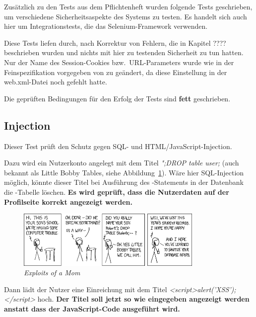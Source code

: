 
Zusätzlich zu den Tests aus dem Pflichtenheft wurden folgende Tests geschrieben,
um verschiedene Sicherheitsaspekte des Systems zu testen.
Es handelt sich auch hier um Integrationstests, die das Selenium-Framework verwenden.

Diese Tests liefen durch, nach Korrektur von Fehlern, die in Kapitel ???? beschrieben wurden und nichts mit hier zu testenden Sicherheit zu tun hatten.
Nur der Name des Session-Cookies bzw.~URL-Parameters wurde wie in der Feinspezifikation vorgegeben von  zu  geändert, da diese Einstellung in der web.xml-Datei noch gefehlt hatte.

Die geprüften Bedingungen für den Erfolg der Tests sind \textbf{fett} geschrieben.

\subsection{Injection}\label{subsec:injection-test}
Dieser Test prüft den Schutz gegen SQL- und HTML/JavaScript-Injection.

Dazu wird ein Nutzerkonto angelegt mit dem Titel \emph{";DROP table user;} (auch bekannt als Little Bobby Tables, siehe Abbildung~\ref{fig:xkcd}).
Wäre hier SQL-Injection möglich, könnte dieser Titel bei Ausführung des -Statements in der Datenbank
die -Tabelle löschen.
\textbf{Es wird geprüft, dass die Nutzerdaten auf der Profilseite korrekt angezeigt werden.}

\begin{figure}[h]
    \centering
    \includegraphics[width=0.8\textwidth]{graphics/xkcd}
    \caption[XKCD]{\emph{Exploits of a Mom}\footnotemark}
    \label{fig:xkcd}
\end{figure}

Dann lädt der Nutzer eine Einreichung mit dem Titel \emph{<script>alert('XSS');</script>} hoch.
\textbf{Der Titel soll jetzt so wie eingegeben angezeigt werden anstatt dass der JavaScript-Code ausgeführt wird.}

